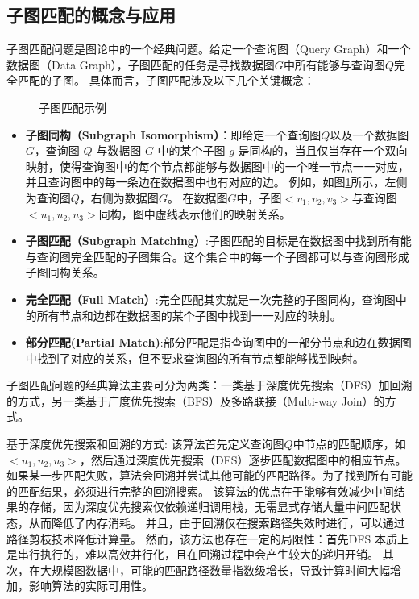 \subsection{子图匹配的概念与应用}
子图匹配问题是图论中的一个经典问题\cite{sm-ullmann-DBLP:journals/jacm/Ullmann76}。给定一个查询图（Query Graph）和一个数据图（Data Graph），子图匹配的任务是寻找数据图$G$中所有能够与查询图$Q$完全匹配的子图。
具体而言，子图匹配涉及以下几个关键概念：
\begin{figure}[h!]
    \centering
    \caption{子图匹配示例}
    \label{fig:example_subgraph_matching}
\end{figure}
\begin{itemize}
    \item \textbf{子图同构（Subgraph Isomorphism）}：即给定一个查询图$Q$以及一个数据图$G$，查询图 $Q$ 与数据图 $G$ 中的某个子图 $g$ 是同构的，当且仅当存在一个双向映射，使得查询图中的每个节点都能够与数据图中的一个唯一节点一一对应，并且查询图中的每一条边在数据图中也有对应的边。
    例如，如图\ref{fig:example_subgraph_matching}所示，左侧为查询图$Q$，右侧为数据图$G$。
    在数据图$G$中，子图$<v_1,v_2,v_3>$与查询图$<u_1,u_2,u_3>$同构，图中虚线表示他们的映射关系。
    \item \textbf{子图匹配（Subgraph Matching）}:子图匹配的目标是在数据图中找到所有能与查询图完全匹配的子图集合。这个集合中的每一个子图都可以与查询图形成子图同构关系。
    \item \textbf{完全匹配（Full Match）}:完全匹配其实就是一次完整的子图同构，查询图中的所有节点和边都在数据图的某个子图中找到一一对应的映射。
    \item \textbf{部分匹配(Partial Match)}:部分匹配是指查询图中的一部分节点和边在数据图中找到了对应的关系，但不要求查询图的所有节点都能够找到映射。
\end{itemize}


子图匹配问题的经典算法主要可分为两类：一类基于深度优先搜索（DFS）加回溯的方式\cite{sm-ullmann-DBLP:journals/jacm/Ullmann76}，另一类基于广度优先搜索（BFS）及多路联接（Multi-way Join）的方式\cite{sm-bfs-DBLP:conf/focs/AtseriasGM08}。

基于深度优先搜索和回溯的方式: 该算法首先定义查询图$Q$中节点的匹配顺序，如$<u_1, u_2, u_3>$，然后通过深度优先搜索（DFS）逐步匹配数据图中的相应节点。
如果某一步匹配失败，算法会回溯并尝试其他可能的匹配路径。为了找到所有可能的匹配结果，必须进行完整的回溯搜索。
该算法的优点在于能够有效减少中间结果的存储，因为深度优先搜索仅依赖递归调用栈，无需显式存储大量中间匹配状态，从而降低了内存消耗。
并且，由于回溯仅在搜索路径失效时进行，可以通过路径剪枝技术降低计算量。
然而，该方法也存在一定的局限性：首先DFS 本质上是串行执行的，难以高效并行化，且在回溯过程中会产生较大的递归开销。
其次，在大规模图数据中，可能的匹配路径数量指数级增长，导致计算时间大幅增加，影响算法的实际可用性。

